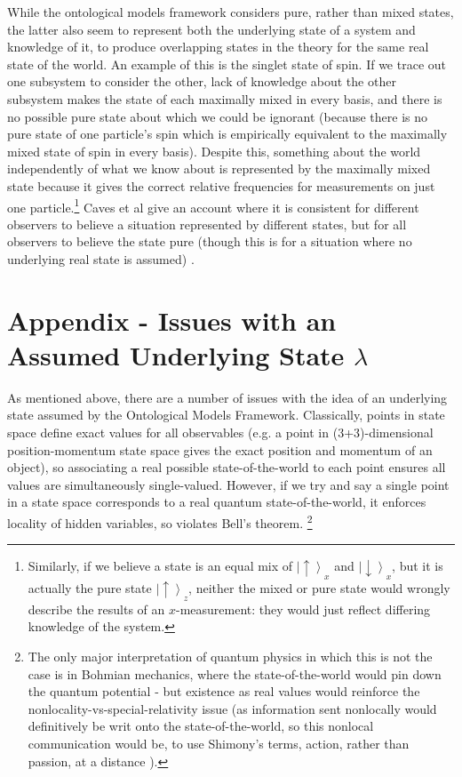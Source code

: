 \documentclass[superscriptaddress,reprint, floatfix, prl,nofootinbib]{revtex4-2}
\newcommand{\ket}[1]{\left| #1 \right\rangle}
\newcommand{\upket}{\ket{\uparrow}}
\newcommand{\downket}{\ket{\downarrow}}
\begin{document}
While the ontological models framework considers pure, rather than mixed states, the latter also seem to represent both the underlying state of a system and knowledge of it, to produce overlapping states in the theory for the same real state of the world. An example of this is the singlet state of spin. If we trace out one subsystem to consider the other, lack of knowledge about the other subsystem makes the state of each maximally mixed in every basis, and there is no possible pure state about which we could be ignorant (because there is no pure state of one particle's spin which is empirically equivalent to the maximally mixed state of spin in every basis). Despite this, something about the world independently of what we know about is represented by the maximally mixed state because it gives the correct relative frequencies for measurements on just one particle.\footnote{Similarly, if we believe a state is an equal mix of $\upket_x$ and $\downket_x$, but it is actually the pure state $\upket_z$, neither the mixed or pure state would wrongly describe the results of an $x$-measurement: they would just reflect differing knowledge of the system.} Caves et al give an account where it is consistent for different observers to believe a situation represented by different states, but for all observers to believe the state pure (though this is for a situation where no underlying real state is assumed) \cite{Caves2002conditions}.

\section{Appendix - Issues with an Assumed Underlying State \texorpdfstring{$\lambda$}{lambda}}
As mentioned above, there are a number of issues with the idea of an underlying state assumed by the Ontological Models Framework. Classically, points in state space define exact values for all observables (e.g. a point in (3+3)-dimensional position-momentum state space gives the exact position and momentum of an object), so associating a real possible state-of-the-world to each point ensures all values are simultaneously single-valued. However, if we try and say a single point in a state space corresponds to a real quantum state-of-the-world, it enforces locality of hidden variables, so violates Bell's theorem. \footnote{The only major interpretation of quantum physics in which this is not the case is in Bohmian mechanics, where the state-of-the-world would pin down the quantum potential - but existence as real values would reinforce the nonlocality-vs-special-relativity issue (as information sent nonlocally would definitively be writ onto the state-of-the-world, so this nonlocal communication would be, to use Shimony's terms, action, rather than passion, at a distance \cite{Shimony1984Passion}).}
\end{document}
